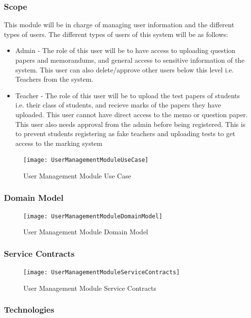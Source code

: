 \documentclass{article}
\begin{document}
		\subsubsection{Scope}
		This module will be in charge of managing user information and the different types of users. The different
		types of users of this system will be as follows:
			\begin{itemize}
				\item{Admin - The role of this user will be to have access to uploading question papers and memorandums,
					  	and general access to sensitive information of the system. This user can also delete/approve other
						users below this level i.e. Teachers from the system.}
				\item{Teacher - The role of this user will be to upload the test papers of students i.e. their class of students,
						and recieve marks of the papers they have uploaded. This user cannot have direct access to the memo
						or question paper. This user also needs approval from the admin before being registered. This is to prevent 
						students registering as fake teachers and uploading tests to get access to the marking system}
			\end{itemize}
			
			\begin{figure}[h]
				\texttt{[image: UserManagementModuleUseCase]}
				\caption{User Management Module Use Case}
			\end{figure}
			
		\subsubsection{Domain Model}
						\begin{figure}[h]
					\texttt{[image: UserManagementModuleDomainModel]}
					\caption{User Management Module Domain Model}
				\end{figure}
				
		\subsubsection{Service Contracts}
						\begin{figure}[h]
					\texttt{[image: UserManagementModuleServiceContracts]}
					\caption{User Management Module Service Contracts}
				\end{figure}
				
		\subsubsection{Technologies}
		
\end{document}
